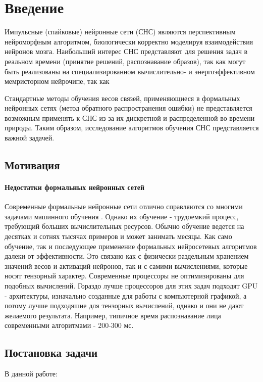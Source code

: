 \documentclass[a4paper]{article}
\begin{document}
\thispagestyle{empty} 

\tableofcontents

\clearpage

\section{Введение}
Импульсные (спайковые) нейронные сети (СНС) являются перспективным нейроморфным алгоритмом, биологически корректно моделируя взаимодействия нейронов мозга. Наибольший интерес СНС представляют для решения задач в реальном времени (принятие решений, распознавание образов), так как могут быть реализованы на специализированном вычислительно- и энергоэффективном мемристорном нейрочипе, так как 

Стандартные методы обучения весов связей, применяющиеся в формальных нейронных сетях (метод обратного распространения ошибки) не представляется возможным применять к СНС из-за их дискретной и распределенной во времени природы. Таким образом, исследование алгоритмов обучения СНС представляется важной задачей.

\subsection{Мотивация}
\paragraph{Недостатки формальных нейронных сетей}
Современные формальные нейронные сети отлично справляются со многими задачами машинного обучения \cite{pmlr-v28-wan13}. Однако их обучение - трудоемкий процесс, требующий больших вычислительных ресурсов. Обычно обучение ведется на десятках и сотнях тысячах примеров и может занимать месяцы. Как само обучение, так и последующее применение формальных нейросетевых алгоритмов далеки от эффективности. Это связано как с физически раздельным хранением значений весов и активаций нейронов, так и с самими вычислениями, которые носят тензорный характер. Современные процессоры не оптимизированы для подобных вычислений. Гораздо лучше процессоров для этих задач подходят GPU - архитектуры, изначально созданные для работы с компьютерной графикой, а потому лучше подходяшие для тензорных вычислений, однако и они не дают желаемого результата. Например, типичное время распознавание лица современными алгоритмами - 200-300 мс.

\subsection{Постановка задачи}
В данной работе:
\end{document}
